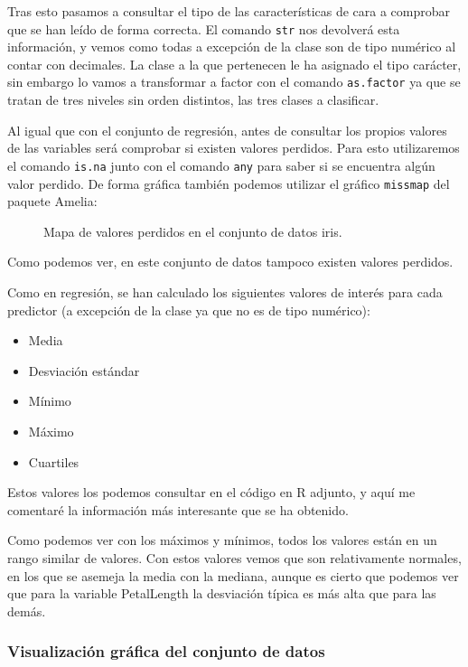 Tras esto pasamos a consultar el tipo de las características de cara a comprobar que se han leído de forma correcta. El comando \texttt{str} nos devolverá esta información, y vemos como todas a excepción de la clase son de tipo numérico al contar con decimales. La clase a la que pertenecen le ha asignado el tipo carácter, sin embargo lo vamos a transformar a factor con el comando \texttt{as.factor} ya que se tratan de tres niveles sin orden distintos, las tres clases a clasificar.

Al igual que con el conjunto de regresión, antes de consultar los propios valores de las variables será comprobar si existen valores perdidos. Para esto utilizaremos el comando \texttt{is.na} junto con el comando \texttt{any} para saber si se encuentra algún valor perdido. De forma gráfica también podemos utilizar el gráfico \texttt{missmap} del paquete Amelia:


\begin{figure}[H]
	\centering
	
	\caption{Mapa de valores perdidos en el conjunto de datos iris.}
	\label{fig:missmap_iris}
\end{figure}

Como podemos ver, en este conjunto de datos tampoco existen valores perdidos.

Como en regresión, se han calculado los siguientes valores de interés para cada predictor (a excepción de la clase ya que no es de tipo numérico):

\begin{itemize}
	\item Media
	\item Desviación estándar
	\item Mínimo
	\item Máximo
	\item Cuartiles
\end{itemize}


Estos valores los podemos consultar en el código en R adjunto, y aquí me comentaré la información más interesante que se ha obtenido.

Como podemos ver con los máximos y mínimos, todos los valores están en un rango similar de valores. Con estos valores vemos que son relativamente normales, en los que se asemeja la media con la mediana, aunque es cierto que podemos ver que para la variable PetalLength la desviación típica es más alta que para las demás.

\subsubsection{Visualización gráfica del conjunto de datos}

